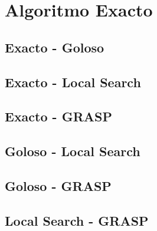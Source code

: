 \section{Algoritmo Exacto}

\subsection{Exacto - Goloso}

\subsection{Exacto - Local Search}

\subsection{Exacto - GRASP}

\subsection{Goloso - Local Search}

\subsection{Goloso - GRASP}

\subsection{Local Search - GRASP}
